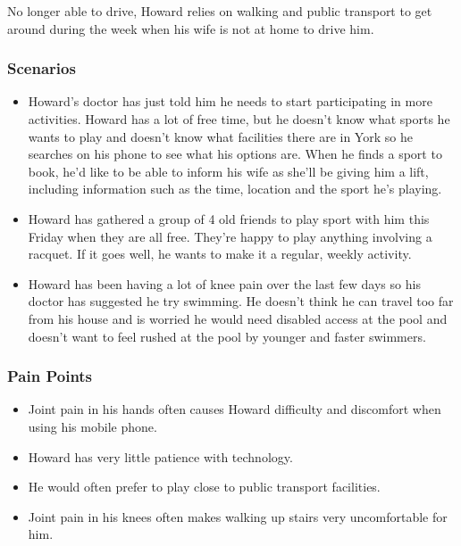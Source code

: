 No longer able to drive, Howard relies on walking and public transport to get
around during the week when his wife is not at home to drive him.


\subsubsection*{Scenarios}
\label{ssub:eldery_scenarios}

\begin{itemize}
	\item Howard's doctor has just told him he needs to start participating in
		more activities. Howard has a lot of free time, but he doesn't know
		what sports he wants to play and doesn't know what facilities there are
		in York so he searches on his phone to see what his options are. When
		he finds a sport to book, he'd like to be able to inform his wife as
		she'll be giving him a lift, including information such as the time,
		location and the sport he's playing.

	\item Howard has gathered a group of 4 old friends to play sport with him
		this Friday when they are all free. They're happy to play anything
		involving a racquet. If it goes well, he wants to make it a regular,
		weekly activity.

	\item Howard has been having a lot of knee pain over the last few days so
		his doctor has suggested he try swimming. He doesn't think he can
		travel too far from his house and is worried he would need disabled
		access at the pool and doesn't want to feel rushed at the pool by
		younger and faster swimmers.
\end{itemize}


\subsubsection*{Pain Points}
\label{ssub:eldery_pain_points}

\begin{itemize}
	\item Joint pain in his hands often causes Howard difficulty and discomfort
		when using his mobile phone.
	\item Howard has very little patience with technology.
	\item He would often prefer to play close to public transport facilities.
	\item Joint pain in his knees often makes walking up stairs very
		uncomfortable for him.
\end{itemize}


